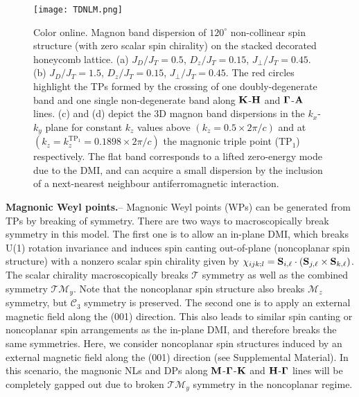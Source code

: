 \documentclass[doublecol]{epl2}
\def\lb{\left(}
\def\rb{\right)}
\begin{document}
  \begin{figure}
\centering
\texttt{[image: TDNLM.png]}
\caption{Color online.  Magnon band dispersion  of $120^\circ$ non-collinear spin structure (with zero scalar spin chirality) on the stacked decorated honeycomb lattice. (a)    $J_D/J_T = 0.5$,  $D_z/J_T = 0.15$, $J_\perp/J_T = 0.45$.  (b)   $J_D/J_T = 1.5$,  $D_z/J_T = 0.15$,  $J_\perp/J_T = 0.45$. The red circles highlight the TPs formed by the crossing of one doubly-degenerate band and one single non-degenerate band along  ${\bf K}$-${\bf H}$  and  ${\bf \Gamma}$-${\bf A}$ lines. (c) and (d) depict the 3D magnon band dispersions in the $k_x$-$k_y$ plane for  constant $k_z$ values  above $(k_z=0.5\times 2\pi/c)$ and at $(k_z=k_z^{\text{TP}_1}=0.1898\times 2\pi/c)$ the magnonic triple point (TP$_1$) respectively.   The flat band corresponds to a lifted zero-energy mode due to the DMI,  and can  acquire a small dispersion by the inclusion of a next-nearest neighbour  antiferromagnetic interaction.}
\label{TDNLM}
\end{figure}
 


 \textbf{Magnonic Weyl points.}-- Magnonic Weyl points (WPs) can be generated from TPs by breaking of symmetry.  There are two ways to macroscopically break symmetry in this model. The first one is to allow an in-plane DMI, which  breaks U(1) rotation invariance and induces spin canting out-of-plane (noncoplanar spin structure) with a nonzero scalar spin chirality given by $\chi_{ijk;l}=  {\bf S}_{i,\ell}\cdot\lb {\bf S}_{j,\ell}\times{\bf S}_{k,\ell}\rb$. The scalar chirality macroscopically breaks $\mathcal T$ symmetry as well as the combined symmetry $\mathcal T\mathcal M_y$. Note that the noncoplanar spin structure also breaks $\mathcal M_{z}$ symmetry, but $\mathcal C_{3}$ symmetry is preserved.  The second one is to apply an external magnetic field along the (001) direction. This also leads to similar spin canting or noncoplanar spin arrangements  as the in-plane DMI, and therefore breaks the same symmetries. Here, we consider  noncoplanar spin structures induced by an external magnetic field along the (001) direction (see Supplemental Material). In this scenario, the magnonic NLs and DPs along ${\bf M}$-${\bf \Gamma}$-${\bf K}$ and ${\bf H}$-${\bf \Gamma}$ lines will be completely gapped out due to broken $\mathcal T\mathcal M_y$ symmetry in the noncoplanar regime.
\end{document}
